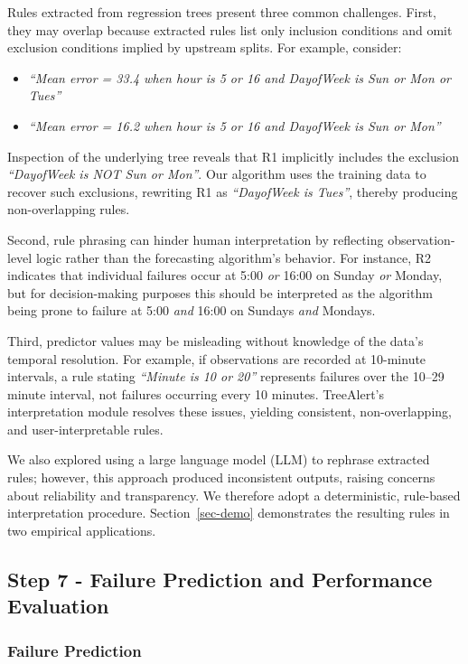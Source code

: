 \documentclass[12pt]{article}
\begin{document}
Rules extracted from regression trees present three common challenges. First, they may overlap because extracted rules list only inclusion conditions and omit exclusion conditions implied by upstream splits. For example, consider:
\begin{itemize}
    \setlength{\itemsep}{0pt}
    \item[(R1)] \textit{``Mean error = 33.4 when hour is 5 or 16 and DayofWeek is Sun or Mon or Tues''}
    \item[(R2)] \textit{``Mean error = 16.2 when hour is 5 or 16 and DayofWeek is Sun or Mon''}
\end{itemize}
Inspection of the underlying tree reveals that R1 implicitly includes the exclusion \textit{``DayofWeek is NOT Sun or Mon''}. Our algorithm uses the training data to recover such exclusions, rewriting R1 as \textit{``DayofWeek is Tues''}, thereby producing non-overlapping rules.

Second, rule phrasing can hinder human interpretation by reflecting observation-level logic rather than the forecasting algorithm’s behavior. For instance, R2 indicates that individual failures occur at 5:00 \emph{or} 16:00 on Sunday \emph{or} Monday, but for decision-making purposes this should be interpreted as the algorithm being prone to failure at 5:00 \emph{and} 16:00 on Sundays \emph{and} Mondays.

Third, predictor values may be misleading without knowledge of the data’s temporal resolution. For example, if observations are recorded at 10-minute intervals, a rule stating \textit{``Minute is 10 or 20''} represents failures over the 10–29 minute interval, not failures occurring every 10 minutes. TreeAlert’s interpretation module resolves these issues, yielding consistent, non-overlapping, and user-interpretable rules.

We also explored using a large language model (LLM) to rephrase extracted rules; however, this approach produced inconsistent outputs, raising concerns about reliability and transparency. We therefore adopt a deterministic, rule-based interpretation procedure. Section~\ref{sec-demo} demonstrates the resulting rules in two empirical applications.

\subsection{Step 7 - Failure Prediction and Performance Evaluation}

\subsubsection{Failure Prediction}
\end{document}
